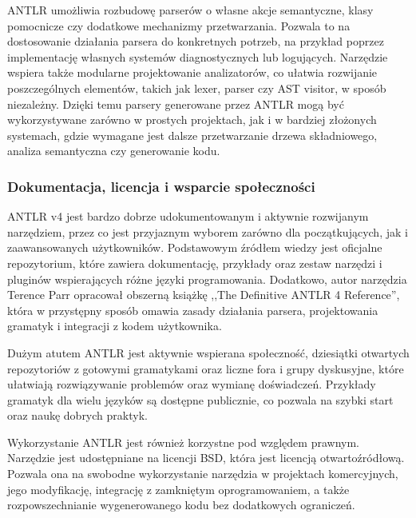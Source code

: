 \documentclass[12pt,twoside]{article}
\begin{document}
ANTLR umożliwia rozbudowę parserów o własne akcje semantyczne, klasy pomocnicze czy dodatkowe mechanizmy przetwarzania. Pozwala to na dostosowanie działania parsera do konkretnych potrzeb, na przykład poprzez implementację własnych systemów diagnostycznych lub logujących. Narzędzie wspiera także modularne projektowanie analizatorów, co ułatwia rozwijanie poszczególnych elementów, takich jak lexer, parser czy AST visitor, w sposób niezależny. Dzięki temu parsery generowane przez ANTLR mogą być wykorzystywane zarówno w prostych projektach, jak i w bardziej złożonych systemach, gdzie wymagane jest dalsze przetwarzanie drzewa składniowego, analiza semantyczna czy generowanie kodu.

\subsubsection{Dokumentacja, licencja i wsparcie społeczności}
ANTLR v4 jest bardzo dobrze udokumentowanym i aktywnie rozwijanym narzędziem, przez co jest przyjaznym wyborem zarówno dla początkujących, jak i zaawansowanych użytkowników. Podstawowym źródłem wiedzy jest oficjalne repozytorium, które zawiera dokumentację, przykłady oraz zestaw narzędzi i pluginów wspierających różne języki programowania. Dodatkowo, autor narzędzia Terence Parr opracował obszerną książkę ,,The Definitive ANTLR 4 Reference'', która w przystępny sposób omawia zasady działania parsera, projektowania gramatyk i integracji z kodem użytkownika.

Dużym atutem ANTLR jest aktywnie wspierana społeczność, dziesiątki otwartych repozytoriów z gotowymi gramatykami oraz liczne fora i grupy dyskusyjne, które ułatwiają rozwiązywanie problemów oraz wymianę doświadczeń. Przykłady gramatyk dla wielu języków są dostępne publicznie, co pozwala na szybki start oraz naukę dobrych praktyk.

Wykorzystanie ANTLR jest również korzystne pod względem prawnym. Narzędzie jest udostępniane na licencji BSD, która jest licencją otwartoźródłową. Pozwala ona na swobodne wykorzystanie narzędzia w projektach komercyjnych, jego modyfikację, integrację z zamkniętym oprogramowaniem, a także rozpowszechnianie wygenerowanego kodu bez dodatkowych ograniczeń.
\end{document}
